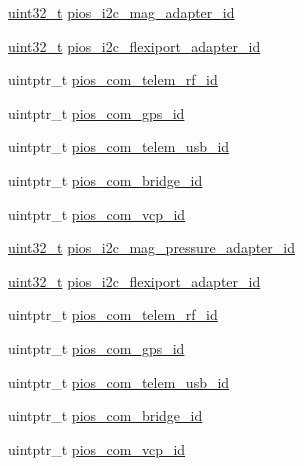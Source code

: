 \begin{DoxyCompactItemize}
\item 
\hyperlink{stdint_8h_a435d1572bf3f880d55459d9805097f62}{uint32\-\_\-t} \hyperlink{group___open_pilot_core_gaf4677b648f4c1c967ab57a2994d6f1a6}{pios\-\_\-i2c\-\_\-mag\-\_\-adapter\-\_\-id}
\item 
\hyperlink{stdint_8h_a435d1572bf3f880d55459d9805097f62}{uint32\-\_\-t} \hyperlink{group___open_pilot_core_ga20b68de0b754d943d653d816aad86148}{pios\-\_\-i2c\-\_\-flexiport\-\_\-adapter\-\_\-id}
\item 
uintptr\-\_\-t \hyperlink{group___open_pilot_core_gae48e848f715b08971e23528feee79339}{pios\-\_\-com\-\_\-telem\-\_\-rf\-\_\-id}
\item 
uintptr\-\_\-t \hyperlink{group___open_pilot_core_ga05dca72c42c6c2b33fa62b8ee0fcb2ea}{pios\-\_\-com\-\_\-gps\-\_\-id}
\item 
uintptr\-\_\-t \hyperlink{group___open_pilot_core_ga513cc36d72b76de2fcb75ff233a79a4a}{pios\-\_\-com\-\_\-telem\-\_\-usb\-\_\-id}
\item 
uintptr\-\_\-t \hyperlink{group___open_pilot_core_gac040f05fa048688ee0269c2768698a14}{pios\-\_\-com\-\_\-bridge\-\_\-id}
\item 
uintptr\-\_\-t \hyperlink{group___open_pilot_core_gaaeb3e0d65ed5c6e7b921c54e1ad905db}{pios\-\_\-com\-\_\-vcp\-\_\-id}
\item 
\hyperlink{stdint_8h_a435d1572bf3f880d55459d9805097f62}{uint32\-\_\-t} \hyperlink{group___open_pilot_core_ga0bc1cddc7bfac02e5a765f1ff09ad29f}{pios\-\_\-i2c\-\_\-mag\-\_\-pressure\-\_\-adapter\-\_\-id}
\item 
\hyperlink{stdint_8h_a435d1572bf3f880d55459d9805097f62}{uint32\-\_\-t} \hyperlink{group___open_pilot_core_ga20b68de0b754d943d653d816aad86148}{pios\-\_\-i2c\-\_\-flexiport\-\_\-adapter\-\_\-id}
\item 
uintptr\-\_\-t \hyperlink{group___open_pilot_core_gae48e848f715b08971e23528feee79339}{pios\-\_\-com\-\_\-telem\-\_\-rf\-\_\-id}
\item 
uintptr\-\_\-t \hyperlink{group___open_pilot_core_ga05dca72c42c6c2b33fa62b8ee0fcb2ea}{pios\-\_\-com\-\_\-gps\-\_\-id}
\item 
uintptr\-\_\-t \hyperlink{group___open_pilot_core_ga513cc36d72b76de2fcb75ff233a79a4a}{pios\-\_\-com\-\_\-telem\-\_\-usb\-\_\-id}
\item 
uintptr\-\_\-t \hyperlink{group___open_pilot_core_gac040f05fa048688ee0269c2768698a14}{pios\-\_\-com\-\_\-bridge\-\_\-id}
\item 
uintptr\-\_\-t \hyperlink{group___open_pilot_core_gaaeb3e0d65ed5c6e7b921c54e1ad905db}{pios\-\_\-com\-\_\-vcp\-\_\-id}

\end{DoxyCompactItemize}
